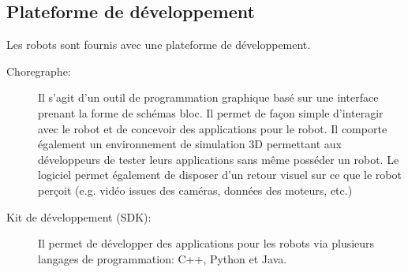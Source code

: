 \subsection{Plateforme de développement}
\label{Entreprise:Les produits: Nao: Plateforme de développement}
Les robots sont fournis avec une plateforme de développement.
\begin{description}
	\item[Choregraphe:] Il s'agit d'un outil de programmation graphique basé sur une interface prenant la forme de schémas bloc. Il permet de façon simple d'interagir avec le robot et de concevoir des applications pour le robot. Il comporte également un environnement de simulation 3D permettant aux développeurs de tester leurs applications sans même posséder un robot. Le logiciel permet également de disposer d'un retour visuel sur ce que le robot perçoit (e.g. vidéo issues des caméras, données des moteurs, etc.)
	
	\item[Kit de développement (SDK):] Il permet de développer des applications pour les robots via plusieurs langages de programmation:  C++, Python et Java.
\end{description}

